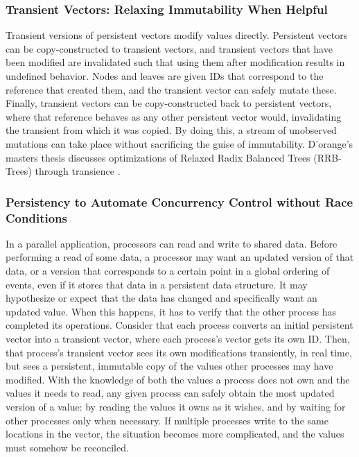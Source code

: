 \documentclass[pageno]{jpaper}
\begin{document}
\subsubsection{Transient Vectors: Relaxing Immutability When Helpful}
Transient versions of persistent vectors modify values directly. Persistent
vectors can be copy-constructed to transient vectors, and transient vectors that
have been modified are invalidated such that using them after modification
results in undefined behavior. Nodes and leaves are given IDs that correspond
to the reference that created them, and the transient vector can safely mutate
these. Finally, transient vectors can be copy-constructed back to persistent
vectors, where that reference behaves as any other persistent vector would,
invalidating the transient from which it was copied. By doing this, a stream of
unobserved mutations can take place without sacrificing the guise of
immutability. D'orange's masters thesis discusses optimizations of Relaxed Radix
Balanced Trees (RRB-Trees) through transience \cite{lorange2014rrb}.

\subsubsection{Persistency to Automate Concurrency Control without Race Conditions}
In a parallel application, processors can read and write to shared data. Before
performing a read of some data, a processor may want an updated version of that
data, or a version that corresponds to a certain point in a global ordering of
events, even if it stores that data in a persistent data structure. It may
hypothesize or expect that the data has changed and specifically want an updated
value. When this happens, it has to verify that the other process  has completed
its operations. Consider that each process converts an initial persistent vector
into a transient vector, where each process's vector gets its own ID. Then, that
process's transient vector sees its own modifications transiently, in real time,
but sees a persistent, immutable copy of the values other processes may have
modified. With the knowledge of both the values a process does not own and the
values it needs to read, any given process can safely obtain the most updated
version of a value: by reading the values it owns as it wishes, and by waiting
for other processes only when necessary. If multiple processes write to the same
locations in the vector, the situation becomes more complicated, and the values
must somehow be reconciled.
\end{document}
